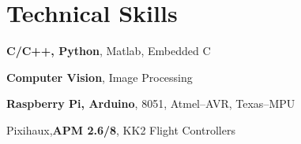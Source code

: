 \halfblankline

\section{Technical Skills}
\begin{innerlist}
    \item \textbf{C/C++, Python}, Matlab, Embedded C
    \item \textbf{Computer Vision}, Image Processing
    \item \textbf{Raspberry Pi, Arduino}, 8051, Atmel--AVR, Texas--MPU
    \item Pixihaux,\textbf{APM 2.6/8}, KK2 Flight Controllers
\end{innerlist}

\halfblankline



